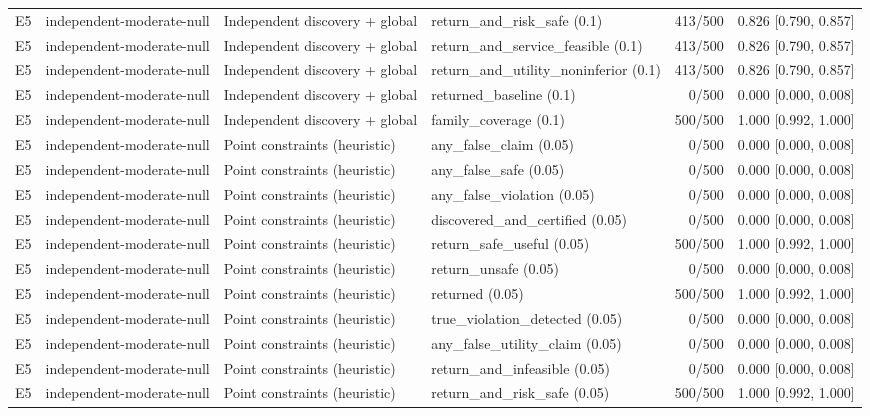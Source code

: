 \begin{longtable}{p{.04\linewidth}p{.18\linewidth}p{.19\linewidth}p{.16\linewidth}r p{.21\linewidth}}
E5 & independent-moderate-null & Independent discovery + global & return\_and\_risk\_safe (0.1) & 413/500 & 0.826 [0.790, 0.857]\\
E5 & independent-moderate-null & Independent discovery + global & return\_and\_service\_feasible (0.1) & 413/500 & 0.826 [0.790, 0.857]\\
E5 & independent-moderate-null & Independent discovery + global & return\_and\_utility\_noninferior (0.1) & 413/500 & 0.826 [0.790, 0.857]\\
E5 & independent-moderate-null & Independent discovery + global & returned\_baseline (0.1) & 0/500 & 0.000 [0.000, 0.008]\\
E5 & independent-moderate-null & Independent discovery + global & family\_coverage (0.1) & 500/500 & 1.000 [0.992, 1.000]\\
E5 & independent-moderate-null & Point constraints (heuristic) & any\_false\_claim (0.05) & 0/500 & 0.000 [0.000, 0.008]\\
E5 & independent-moderate-null & Point constraints (heuristic) & any\_false\_safe (0.05) & 0/500 & 0.000 [0.000, 0.008]\\
E5 & independent-moderate-null & Point constraints (heuristic) & any\_false\_violation (0.05) & 0/500 & 0.000 [0.000, 0.008]\\
E5 & independent-moderate-null & Point constraints (heuristic) & discovered\_and\_certified (0.05) & 0/500 & 0.000 [0.000, 0.008]\\
E5 & independent-moderate-null & Point constraints (heuristic) & return\_safe\_useful (0.05) & 500/500 & 1.000 [0.992, 1.000]\\
E5 & independent-moderate-null & Point constraints (heuristic) & return\_unsafe (0.05) & 0/500 & 0.000 [0.000, 0.008]\\
E5 & independent-moderate-null & Point constraints (heuristic) & returned (0.05) & 500/500 & 1.000 [0.992, 1.000]\\
E5 & independent-moderate-null & Point constraints (heuristic) & true\_violation\_detected (0.05) & 0/500 & 0.000 [0.000, 0.008]\\
E5 & independent-moderate-null & Point constraints (heuristic) & any\_false\_utility\_claim (0.05) & 0/500 & 0.000 [0.000, 0.008]\\
E5 & independent-moderate-null & Point constraints (heuristic) & return\_and\_infeasible (0.05) & 0/500 & 0.000 [0.000, 0.008]\\
E5 & independent-moderate-null & Point constraints (heuristic) & return\_and\_risk\_safe (0.05) & 500/500 & 1.000 [0.992, 1.000]\\

\end{longtable}

